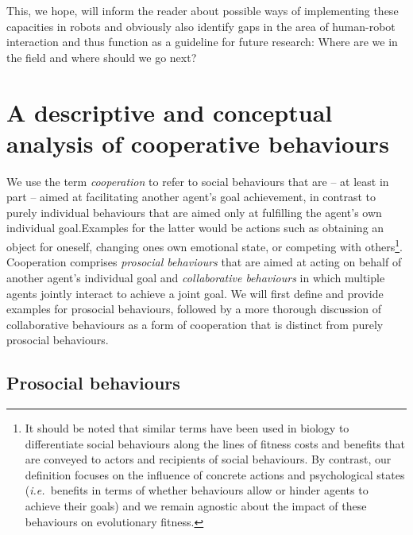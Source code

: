 \documentclass{article}
\newcommand{\ie}{{\textit{i.e.~}}}
\begin{document}
This, we hope, will inform the reader about possible ways of implementing these
capacities in robots and obviously also identify gaps in the area of
human-robot interaction and thus function as a guideline for future research:
Where are we in the field and where should we go next?


\section{A descriptive and conceptual analysis of cooperative behaviours}

We use the term \emph{cooperation} to refer to social behaviours that are -- at
least in part -- aimed at facilitating another agent's goal achievement, in
contrast to purely individual behaviours that are aimed only at fulfilling the
agent's own individual goal.Examples for the latter would be actions such as
obtaining an object for oneself, changing ones own emotional state, or
competing with others\footnote{It should be noted that similar terms have been
used in biology to differentiate social behaviours along the lines of fitness costs
and benefits that are conveyed to actors and recipients of social behaviours. By
contrast, our definition focuses on the influence of concrete actions and
psychological states (\ie benefits in terms of whether behaviours allow or
hinder agents to achieve their goals) and we remain agnostic about the impact
of these behaviours on evolutionary fitness.}. Cooperation comprises
\emph{prosocial behaviours} that are aimed at acting on behalf of another
agent's individual goal and \emph{collaborative behaviours} in which
multiple agents jointly interact to achieve a joint goal. We will first define
and provide examples for prosocial behaviours, followed by a more thorough
discussion of collaborative behaviours as a form of cooperation that is distinct
from purely prosocial behaviours.

\subsection{Prosocial behaviours}
\end{document}
